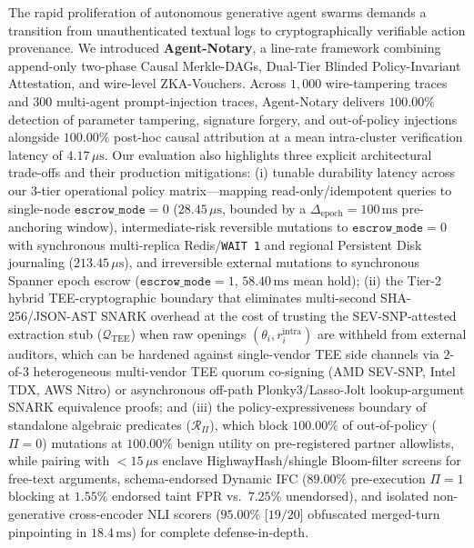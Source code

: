 \documentclass[conference,10pt]{IEEEtran}
\begin{document}
The rapid proliferation of autonomous generative agent swarms demands a transition from unauthenticated textual logs to cryptographically verifiable action provenance. We introduced \textbf{Agent-Notary}, a line-rate framework combining append-only two-phase Causal Merkle-DAGs, Dual-Tier Blinded Policy-Invariant Attestation, and wire-level ZKA-Vouchers. Across $1{,}000$ wire-tampering traces and $300$ multi-agent prompt-injection traces, Agent-Notary delivers $100.00\%$ detection of parameter tampering, signature forgery, and out-of-policy injections alongside $100.00\%$ post-hoc causal attribution at a mean intra-cluster verification latency of $4.17\,\mu\text{s}$. Our evaluation also highlights three explicit architectural trade-offs and their production mitigations: (i) tunable durability latency across our 3-tier operational policy matrix---mapping read-only/idempotent queries to single-node $\texttt{escrow\_mode}=0$ ($28.45\,\mu\text{s}$, bounded by a $\Delta_{\text{epoch}} = 100\,\text{ms}$ pre-anchoring window), intermediate-risk reversible mutations to $\texttt{escrow\_mode}=0$ with synchronous multi-replica Redis/\texttt{WAIT 1} and regional Persistent Disk journaling ($213.45\,\mu\text{s}$), and irreversible external mutations to synchronous Spanner epoch escrow ($\texttt{escrow\_mode}=1$, $58.40\,\text{ms}$ mean hold); (ii) the Tier-2 hybrid TEE-cryptographic boundary that eliminates multi-second SHA-256/JSON-AST SNARK overhead at the cost of trusting the SEV-SNP-attested extraction stub ($\mathcal{Q}_{\text{TEE}}$) when raw openings $(\theta_i, r_i^{\text{intra}})$ are withheld from external auditors, which can be hardened against single-vendor TEE side channels via $2$-of-$3$ heterogeneous multi-vendor TEE quorum co-signing (AMD SEV-SNP, Intel TDX, AWS Nitro) or asynchronous off-path Plonky3/Lasso-Jolt lookup-argument SNARK equivalence proofs; and (iii) the policy-expressiveness boundary of standalone algebraic predicates ($\mathcal{R}_{\Pi}$), which block $100.00\%$ of out-of-policy ($\Pi=0$) mutations at $100.00\%$ benign utility on pre-registered partner allowlists, while pairing with $< 15\,\mu\text{s}$ enclave HighwayHash/shingle Bloom-filter screens for free-text arguments, schema-endorsed Dynamic IFC ($89.00\%$ pre-execution $\Pi=1$ blocking at $1.55\%$ endorsed taint FPR vs.\ $7.25\%$ unendorsed), and isolated non-generative cross-encoder NLI scorers ($95.00\%$ [$19/20$] obfuscated merged-turn pinpointing in $18.4\,\text{ms}$) for complete defense-in-depth.
\end{document}
